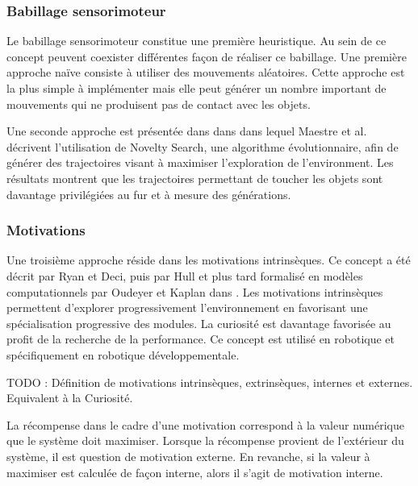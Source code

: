 \documentclass[draft]{llncs}
\begin{document}
\subsubsection{Babillage sensorimoteur}

Le babillage sensorimoteur constitue une première heuristique.
Au sein de ce concept peuvent coexister différentes façon de réaliser ce babillage. Une première approche naïve consiste à utiliser des mouvements aléatoires.
Cette approche est la plus simple à implémenter mais elle peut générer un nombre important de mouvements qui ne produisent pas de contact avec les objets.

Une seconde approche est présentée dans dans \cite{Maestre2015} dans lequel Maestre et al. décrivent l'utilisation de Novelty Search, une algorithme évolutionnaire, afin de générer des trajectoires visant à maximiser l'exploration de l'environment.
Les résultats montrent que les trajectoires permettant de toucher les objets sont davantage privilégiées au fur et à mesure des générations.




\subsubsection{Motivations}

Une troisième approche réside dans les motivations intrinsèques.
Ce concept a été décrit par Ryan et Deci, puis par Hull et plus tard formalisé en modèles computationnels par Oudeyer et Kaplan dans \cite{10.3389/neuro.12.006.2007}.
Les motivations intrinsèques permettent d'explorer progressivement l'environnement en favorisant une spécialisation progressive des modules.
La curiosité est davantage favorisée au profit de la recherche de la performance.
Ce concept est utilisé en robotique et spécifiquement en robotique développementale.

TODO : Définition de motivations intrinsèques, extrinsèques, internes et externes. Equivalent à la Curiosité. 


La récompense dans le cadre d'une motivation correspond à la valeur numérique que le système doit maximiser.
Lorsque la récompense provient de l'extérieur du système, il est question de motivation externe.
En revanche, si la valeur à maximiser est calculée de façon interne, alors il s'agit de motivation interne.


\end{document}
